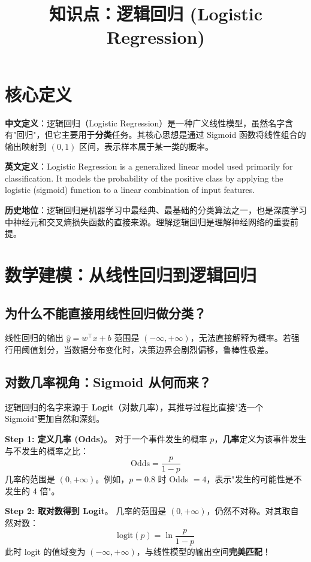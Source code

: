 \documentclass[12pt, a4paper]{article}
\title{知识点：逻辑回归 (Logistic Regression)}
\author{}
\date{}
\begin{document}
\maketitle

\section{核心定义}
\textbf{中文定义}：逻辑回归（Logistic Regression）是一种广义线性模型，虽然名字含有"回归"，但它主要用于\textbf{分类}任务。其核心思想是通过 Sigmoid 函数将线性组合的输出映射到 $(0, 1)$ 区间，表示样本属于某一类的概率。

\textbf{英文定义}：Logistic Regression is a generalized linear model used primarily for classification. It models the probability of the positive class by applying the logistic (sigmoid) function to a linear combination of input features.

\textbf{历史地位}：逻辑回归是机器学习中最经典、最基础的分类算法之一，也是深度学习中神经元和交叉熵损失函数的直接来源。理解逻辑回归是理解神经网络的重要前提。

\section{数学建模：从线性回归到逻辑回归}

\subsection{为什么不能直接用线性回归做分类？}
线性回归的输出 $\hat{y} = w^\top x + b$ 范围是 $(-\infty, +\infty)$，无法直接解释为概率。若强行用阈值划分，当数据分布变化时，决策边界会剧烈偏移，鲁棒性极差。

\subsection{对数几率视角：Sigmoid 从何而来？}
逻辑回归的名字来源于 \textbf{Logit}（对数几率），其推导过程比直接"选一个 Sigmoid"更加自然和深刻。

\textbf{Step 1: 定义几率 (Odds)}。
对于一个事件发生的概率 $p$，\textbf{几率}定义为该事件发生与不发生的概率之比：
$$ \text{Odds} = \frac{p}{1 - p} $$
几率的范围是 $(0, +\infty)$。例如，$p=0.8$ 时 Odds $= 4$，表示"发生的可能性是不发生的 4 倍"。

\textbf{Step 2: 取对数得到 Logit}。
几率的范围是 $(0, +\infty)$，仍然不对称。对其取自然对数：
$$ \text{logit}(p) = \ln \frac{p}{1 - p} $$
此时 logit 的值域变为 $(-\infty, +\infty)$，与线性模型的输出空间\textbf{完美匹配}！
\end{document}
